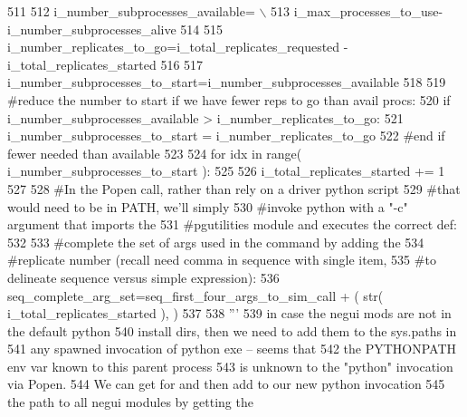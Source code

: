 \begin{DoxyCode}
511 
512                 i\_number\_subprocesses\_available= \(\backslash\)
513                         i\_max\_processes\_to\_use-i\_number\_subprocesses\_alive
514 
515                 i\_number\_replicates\_to\_go=i\_total\_replicates\_requested - i\_total\_replicates\_started
516 
517                 i\_number\_subprocesses\_to\_start=i\_number\_subprocesses\_available
518 
519                 \textcolor{comment}{#reduce the number to start if we have fewer reps to go than avail procs:}
520                 \textcolor{keywordflow}{if} i\_number\_subprocesses\_available > i\_number\_replicates\_to\_go:
521                         i\_number\_subprocesses\_to\_start = i\_number\_replicates\_to\_go
522                 \textcolor{comment}{#end if fewer needed than available}
523 
524                 \textcolor{keywordflow}{for} idx \textcolor{keywordflow}{in} range( i\_number\_subprocesses\_to\_start ):
525 
526                     i\_total\_replicates\_started += 1
527                     
528                     \textcolor{comment}{#In the Popen call, rather than rely on a driver python script }
529                     \textcolor{comment}{#that would need to be in PATH, we'll simply}
530                     \textcolor{comment}{#invoke python with a "-c" argument that imports the }
531                     \textcolor{comment}{#pgutilities module and executes the correct def:}
532             
533                     \textcolor{comment}{#complete the set of args used in the command by adding the}
534                     \textcolor{comment}{#replicate number (recall need comma in sequence with single item,}
535                     \textcolor{comment}{#to delineate sequence versus simple expression):}
536                     seq\_complete\_arg\_set=seq\_first\_four\_args\_to\_sim\_call + ( str( 
      i\_total\_replicates\_started ), )
537 
538                     \textcolor{stringliteral}{'''}
539 \textcolor{stringliteral}{                    in case the negui mods are not in the default python }
540 \textcolor{stringliteral}{                    install dirs, then we need to add them to the sys.paths in}
541 \textcolor{stringliteral}{                    any  spawned invocation of python exe -- seems that }
542 \textcolor{stringliteral}{                    the PYTHONPATH env var known to this parent process }
543 \textcolor{stringliteral}{                    is unknown to the "python" invocation via Popen.  }
544 \textcolor{stringliteral}{                    We can get for and then add to our new python invocation}
545 \textcolor{stringliteral}{                    the path to all negui modules by getting the}

\end{DoxyCode}

